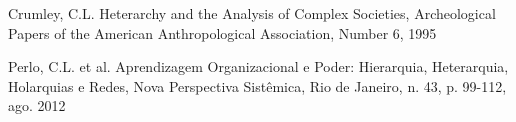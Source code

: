 \documentclass[
12pt,		%
openright,	%
twoside,  %
a4paper,			%
chapter=TITLE,		%
english,			%
french,				%
spanish,			%
brazil				%
]{USPSC-classe/USPSC}
\begin{document}
\begin{flushleft}
\begin{flushleft}
\begin{flushleft}
\begin{flushleft}
\begin{flushleft}
\begin{flushleft}
\begin{flushleft}
\begin{flushleft}
[CRUMLEY, 1995] Crumley, C.L. Heterarchy and the Analysis of Complex Societies, Archeological Papers of the American Anthropological Association, Number 6, 1995
\end{flushleft}


\end{flushleft}


\end{flushleft}


\end{flushleft}


\end{flushleft}


\end{flushleft}


\end{flushleft}


\end{flushleft}


\begin{flushleft}
\begin{flushleft}
\begin{flushleft}
\begin{flushleft}
\begin{flushleft}
\begin{flushleft}
\begin{flushleft}
\begin{flushleft}
[PERLO et al., 2012] Perlo, C.L. et al. Aprendizagem Organizacional e Poder: Hierarquia, Heterarquia, Holarquias e Redes, Nova Perspectiva Sist\^emica, Rio de Janeiro, n. 43, p. 99-112, ago. 2012
\end{flushleft}


\end{flushleft}


\end{flushleft}


\end{flushleft}


\end{flushleft}


\end{flushleft}


\end{flushleft}


\end{flushleft}
\end{document}
